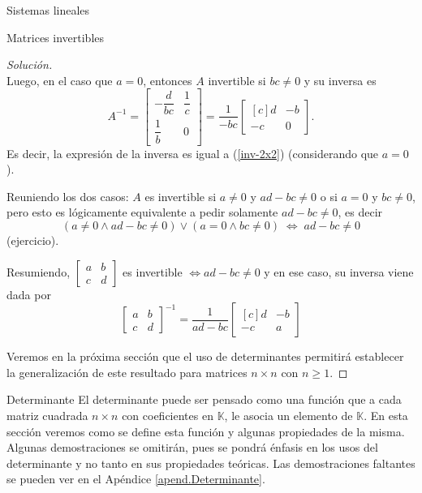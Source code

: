 \documentclass[a4paper,12pt,twoside,spanish,reqno]{amsbook}
\theoremstyle{definition}
\theoremstyle{remark}
\newcommand{\K}{\mathbb K}
\begin{document}
\begin{chapter}{Sistemas lineales}
\begin{section}{Matrices invertibles}
\begin{proof}[Solución]
\begin{equation*}
				\end{equation*}  
				Luego, en el caso  que $a=0$, entonces $A$ invertible si  $b c\not=0$ y su inversa es
				\begin{equation*}
				A^{-1} = \begin{bmatrix}-\dfrac{d}{bc}&\dfrac{1}{c}\\[6pt]\dfrac{1}{b}&0\end{bmatrix} = 
				\dfrac{1}{-bc}
				\begin{bmatrix*}[c]d&-b\\-c&0\end{bmatrix*}.
				\end{equation*}
				Es decir, la expresión de la inversa es igual a (\ref{inv-2x2}) (considerando que  $a=0$).
				
				Reuniendo los dos casos:  $A$ es invertible si $a\not=0$ y  $ad-bc\not=0$ o si $a=0$ y $bc\not=0$, pero esto es lógicamente equivalente a pedir solamente  $ad-bc\not=0$, es decir
				\begin{equation*}
				(a\not=0 \wedge ad-bc\not=0) \vee (a=0 \wedge bc\not=0)\; \Leftrightarrow\; ad-bc\not=0
				\end{equation*}
				(ejercicio).
				
				Resumiendo, $\begin{bmatrix*} a&b\\c&d\end{bmatrix*}$ es invertible  $\Leftrightarrow ad-bc\not=0$  y en ese caso,  su inversa viene dada por 
				\begin{equation}
				\begin{bmatrix*} a&b\\c&d\end{bmatrix*}^{-1} =  \dfrac{1}{ad-bc}
				\begin{bmatrix*}[c]d&-b\\-c&a\end{bmatrix*}
				\end{equation} 
				
				\vskip 6pt
				
				Veremos en la próxima sección que el uso de determinantes permitirá establecer la generalización de este resultado para matrices $n \times n$ con $n\ge 1$.
				
			\end{proof}
			
		\end{section}
		
		
	\begin{section}{Determinante}\label{seccion-determinate}
	El determinante puede ser pensado como una función que a cada matriz cuadrada $n \times n$ con coeficientes en $\K$,  le asocia un elemento de $\K$. En  esta sección veremos como se define esta función y algunas propiedades de la misma. Algunas  demostraciones se omitirán, pues se pondrá énfasis en los usos del determinante y no tanto en sus propiedades teóricas. Las demostraciones faltantes se pueden ver en el Apéndice \ref{apend.Determinante}.
	

\end{section}
\end{chapter}
\end{document}
